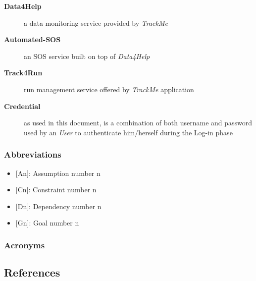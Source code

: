 \documentclass[a4paper]{article}
\begin{document}
\begin{description}
                    \item[\textbf{Data4Help}] a data monitoring service provided by \textit{TrackMe}
                    
                    \item[\textbf{Automated-SOS}] an SOS service built on top of \textit{Data4Help}
                    
                    \item[\textbf{Track4Run}] run management service offered by \textit{TrackMe} application
                    
                    \item[\textbf{Credential}] as used in this document, is a combination of both username and password used by an \textit{User} to authenticate him/herself during the Log-in phase
                \end{description}
                
            \subsubsection{Abbreviations}
            \begin{itemize}
                \item $[$An$]$: Assumption number n
                \item $[$Cn$]$: Constraint number n
                \item $[$Dn$]$: Dependency number n
                \item $[$Gn$]$: Goal number n
            \end{itemize}
            
            \subsubsection{Acronyms}
            \begin{acronym}
            \end{acronym}
            
    \subsection{References}
        \printbibliography[heading=none]
\newpage
\end{document}
